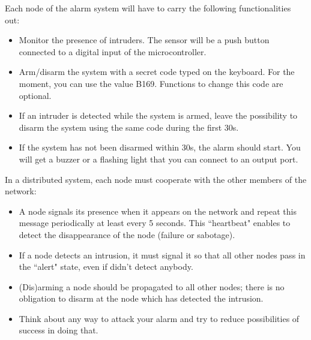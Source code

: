 \documentclass[10pt,a4paper]{article}
\theoremstyle{definition}%
\begin{document}
Each node of the alarm system will have to carry the following functionalities out:
\begin{itemize}
\item Monitor the presence of intruders. %
The sensor will be a push button connected to a digital input of the microcontroller.

\item Arm/disarm the system with a secret code typed on the keyboard. For the moment, you can
use the value B169. Functions to change this code are optional.
\item If an intruder is detected while the system is armed, leave the possibility to disarm the
system using the same code during the first 30s.
\item If the system has not been disarmed within 30s, the alarm should start. You will get a
buzzer or a flashing light that you can connect to an output port.
\end{itemize}

\vspace{0.5cm}

In a distributed system, each node must cooperate with the other members of the network:
\begin{itemize}
\item A node signals its presence when it appears on the network and repeat this message
periodically at least every 5 seconds. This ``heartbeat" enables to detect the disappearance
of the node (failure or sabotage).
\item If a node detects an intrusion, it must signal it so that all other nodes pass in the ``alert"
state, even if didn't detect anybody.
\item (Dis)arming a node should be propagated to all other nodes; there is no obligation to disarm
at the node which has detected the intrusion.
\item Think about any way to attack your alarm and try to reduce possibilities of success in doing that.
\end{itemize}

\newpage
\end{document}
